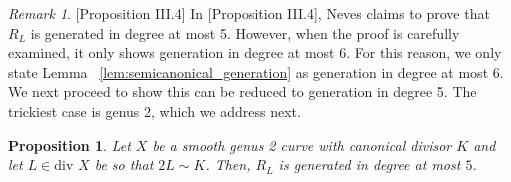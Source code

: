 \documentclass{amsart}
\theoremstyle{plain}
\newtheorem{prop}[thm]{Proposition}
\theoremstyle{definition}
\theoremstyle{remark}
\newtheorem{rem}[thm]{Remark}
\numberwithin{equation}{section}
\newcommand \di{\text{div }}
\begin{document}
\begin{rem}
\cite{neves:halfcan}[Proposition III.4]
In \cite{neves:halfcan}[Proposition III.4], Neves claims to prove that $R_L$ is generated in degree at most 5. However, when the proof is carefully examined, it only shows generation in degree at most 6. For this reason, we only state Lemma ~\ref{lem:semicanonical_generation} as generation in degree at most 6. We next proceed to show this can be reduced to generation in degree 5. The trickiest case is genus 2, which we address next.
\end{rem}



\begin{prop}
\label{prop:genus_2_generation_5}
Let $X$ be a smooth genus 2 curve with canonical divisor $K$ and let $L \in \di X$ be so that $2L \sim K$. 
Then, $R_L$ is generated in degree at most $5$.
\end{prop}
\end{document}
